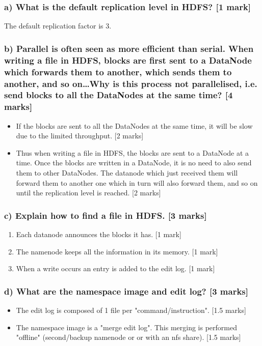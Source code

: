 \documentclass[11pt,a4paper]{article}
\begin{document}
\subsubsection*{a) What is the default replication level in HDFS? [1 mark]}
The default replication factor is 3.
\subsubsection*{b) Parallel is often seen as more efficient than serial. When writing a file in HDFS, blocks are first sent to a DataNode which forwards them to another, which sends them to another, and so on…Why is this process not parallelised, i.e. send blocks to all the DataNodes at the same time? [4 marks]}

\begin{itemize}
\item If the blocks are sent to all the DataNodes at the same time, it will be slow due to the limited throughput. [2 marks]
\item Thus when writing a file in HDFS, the blocks are sent to a DataNode at a time. Once the blocks are written in a DataNode, it is no need to also send them to other DataNodes. The datanode which just received them will forward them to another one which in turn will also forward them, and so on until the replication level is reached. [2 marks]
\end{itemize}

\subsubsection*{c) Explain how to find a file in HDFS. [3 marks]}
\begin{enumerate}
	\item Each datanode announces the blocks it has. [1 mark]
	\item The namenode keeps all the information in its memory. [1 mark]
	\item When a write occurs an entry is added to the edit log. [1 mark]
\end{enumerate}

\subsubsection*{d) What are the namespace image and edit log? [3 marks]}

\begin{itemize}
\item The edit log is composed of 1 file per "command/instruction". [1.5 marks]
\item The namespace image is a "merge edit log". This merging is performed "offline" (second/backup namenode or or with an nfs share). [1.5 marks]
\end{itemize}
\end{document}
